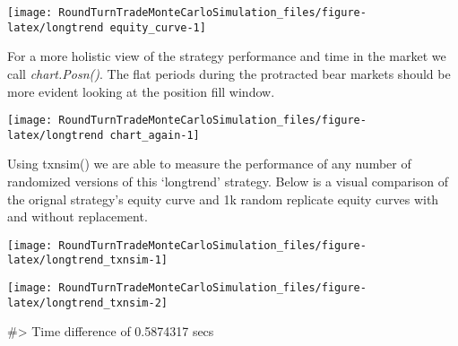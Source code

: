 \begin{Schunk}


\begin{center}\texttt{[image: RoundTurnTradeMonteCarloSimulation\_files/figure-latex/longtrend equity\_curve-1]} \end{center}

\end{Schunk}

For a more holistic view of the strategy performance and time in the
market we call \emph{chart.Posn()}. The flat periods during the
protracted bear markets should be more evident looking at the position
fill window.

\begin{Schunk}


\begin{center}\texttt{[image: RoundTurnTradeMonteCarloSimulation\_files/figure-latex/longtrend chart\_again-1]} \end{center}

\end{Schunk}

Using txnsim() we are able to measure the performance of any number of
randomized versions of this `longtrend' strategy. Below is a visual
comparison of the orignal strategy's equity curve and 1k random
replicate equity curves with and without replacement.

\begin{Schunk}


\begin{center}\texttt{[image: RoundTurnTradeMonteCarloSimulation\_files/figure-latex/longtrend\_txnsim-1]} \end{center}



\begin{center}\texttt{[image: RoundTurnTradeMonteCarloSimulation\_files/figure-latex/longtrend\_txnsim-2]} \end{center}

\begin{Soutput}
#> Time difference of 0.5874317 secs
\end{Soutput}
\end{Schunk}

